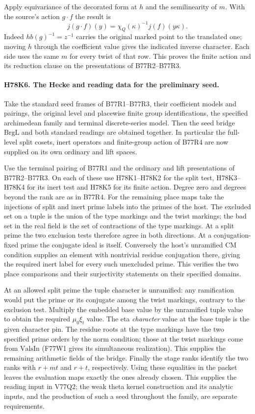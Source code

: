 Apply equivariance of the decorated form at $h$ and the semilinearity
of $m$. With the source's action $g\cdot f$ the result is
\[
       j(g\cdot f)(y)=\chi_Q(\kappa)^{-1}j(f)(y\kappa).
\]
Indeed $hb(g)^{-1}=z^{-1}$ carries the original marked point to
the translated one; moving $h$ through the coefficient value gives
the indicated inverse character. Each side uses the same $m$ for
every twist of that row. This proves the finite action and its
reduction clause on the presentations of B77R2--B77R3.

\paragraph{H78K6. The Hecke and reading data for the preliminary seed.}
Take the standard seed frames of B77R1--B77R3, their coefficient
models and pairings, the original level and placewise finite group
identifications, the specified archimedean family and terminal
discrete-series model. Then the seed bridge $\mathrm{BrgL}$ and both
standard readings are obtained together. In particular the full-level
split cosets, inert operators and finite-group action of B77R4 are
now supplied on its own ordinary and lift spaces.

Use the terminal pairing of B77R1 and the ordinary and lift
presentations of B77R2--B77R3. On each of these use H78K1--H78K2
for the split test, H78K3--H78K4 for its inert test and H78K5 for
its finite action. Degree zero and degrees beyond the rank are as in
B77R4. For the remaining place maps take the injections of split and
inert prime labels into the primes of the host. The excluded set on
a tuple is the union of the type markings and the twist markings;
the bad set in the real field is the set of contractions of the type
markings. At a split prime the two exclusion tests therefore agree
in both directions. At a conjugation-fixed prime the conjugate
ideal is itself. Conversely the host's unramified CM condition
supplies an element with nontrivial residue conjugation there,
giving the required inert label for every such unexcluded prime.
This verifies the two place comparisons and their surjectivity
statements on their specified domains.

At an allowed split prime the tuple character is unramified: any
ramification would put the prime or its conjugate among the twist
markings, contrary to the exclusion test. Multiply the embedded
base value by the unramified tuple value to obtain the required
$\mu_0\xi_t$ value. The eta \emph{character} value at the base tuple
is the given character pin. The residue roots at the type markings
have the two specified prime orders by the norm condition; those at
the twist markings come from $\mathrm{ValsIn}$ (F77W1 gives its
simultaneous realization). This supplies the remaining arithmetic
fields of the bridge. Finally the stage ranks identify the two
ranks with $r+mt$ and $r+t$, respectively. Using these equalities
in the packet leaves the evaluation maps exactly the ones already
chosen. This supplies the reading input in V77Q2; the weak theta
kernel construction and its analytic inputs, and the production
of such a seed throughout the family, are separate requirements.
